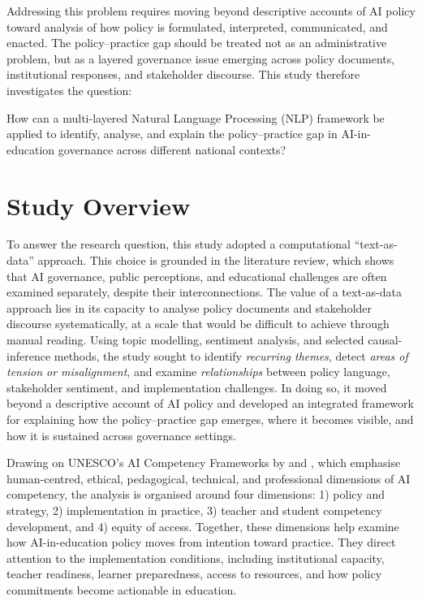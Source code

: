Addressing this problem requires moving beyond descriptive accounts of AI policy 
toward analysis of how policy is formulated, interpreted, communicated, and 
enacted. The policy--practice gap should be treated not as an 
administrative problem, but as a layered governance issue emerging across 
policy documents, institutional responses, and stakeholder discourse. 
This study therefore investigates the question:

\begin{center}
  \begin{tcolorbox}[
      width=\linewidth,
      colback=gray!3,
      colframe=black,
      boxrule=0.6pt,
      title=Research Question,
      colbacktitle=gray!20,
      coltitle=black,
      fonttitle=\bfseries
      ] 
      How can a multi-layered Natural Language Processing (NLP) framework be applied
      to identify, analyse, and explain the policy--practice gap in AI-in-education
      governance across different national contexts?
  \end{tcolorbox}
\end{center}

\section{Study Overview}

To answer the research question, this study adopted a computational ``text-as-data''
approach. This choice is grounded in the literature review, which shows that AI
governance, public perceptions, and educational challenges are often examined
separately, despite their interconnections. The value of a text-as-data
approach lies in its capacity to analyse policy documents and stakeholder discourse
systematically, at a scale that would be difficult to achieve through manual reading.
Using topic modelling, sentiment analysis, and selected causal-inference methods, the study sought to identify \textit{recurring themes}, detect
\textit{areas of tension or misalignment}, and examine \textit{relationships} between
policy language, stakeholder sentiment, and implementation challenges. In doing so,
it moved beyond a descriptive account of AI policy and developed an integrated
framework for explaining how the policy--practice gap emerges, where it
becomes visible, and how it is sustained across governance settings.

Drawing on UNESCO's AI Competency Frameworks by \cite{miao2024aiteachers} and
\cite{miao2024aistudents}, which emphasise human-centred, ethical, pedagogical,
technical, and professional dimensions of AI competency, the analysis is organised
around four dimensions: 1) policy and strategy, 2) implementation in practice, 3)
teacher and student competency development, and 4) equity of access. Together, these
dimensions help examine how AI-in-education policy moves from intention toward
practice. They direct attention to the implementation conditions, including
institutional capacity, teacher readiness, learner preparedness, access to resources,
and how policy commitments become actionable in education.

